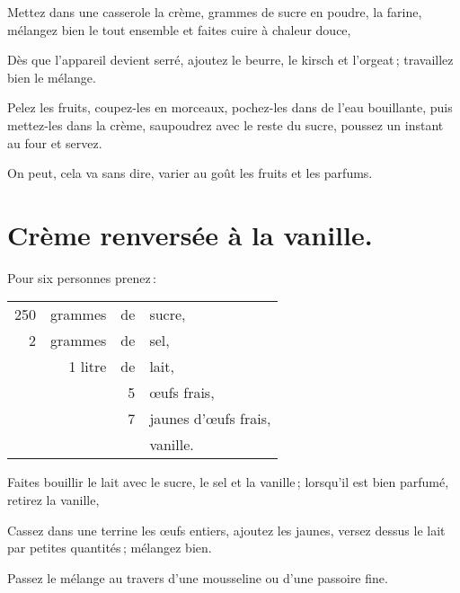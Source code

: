 Mettez dans une casserole la crème, {\mmm} grammes de sucre en poudre, la farine,
mélangez bien le tout ensemble et faites cuire à chaleur douce,

Dès que l'appareil devient serré, ajoutez le beurre, le kirsch et l'orgeat ;
travaillez bien le mélange.

Pelez les fruits, coupez-les en morceaux, pochez-les dans de l'eau bouillante,
puis mettez-les dans la crème, saupoudrez avec le reste du sucre, poussez un
instant au four et servez.

\sk

On peut, cela va sans dire, varier au goût les fruits et les parfums.

\section*{\centering Crème renversée à la vanille.}
{}

Pour six personnes prenez :

\footnotesize
\begin{longtable}{rrrp{16em}}
    250 & grammes & de & sucre,                                                                           \\
      2 & grammes & de & sel,                                                                             \\
        & 1 litre & de & lait,                                                                            \\
        &         &  5 & œufs frais,                                                                      \\
        &         &  7 & jaunes d'œufs frais,                                                             \\
        &         &    & vanille.                                                                         \\
\end{longtable}
\normalsize

Faites bouillir le lait avec le sucre, le sel et la vanille ; lorsqu'il est bien
parfumé, retirez la vanille,

Cassez dans une terrine les œufs entiers, ajoutez les jaunes, versez dessus le lait
par petites quantités ; mélangez bien.

Passez le mélange au travers d'une mousseline ou d'une passoire fine.

